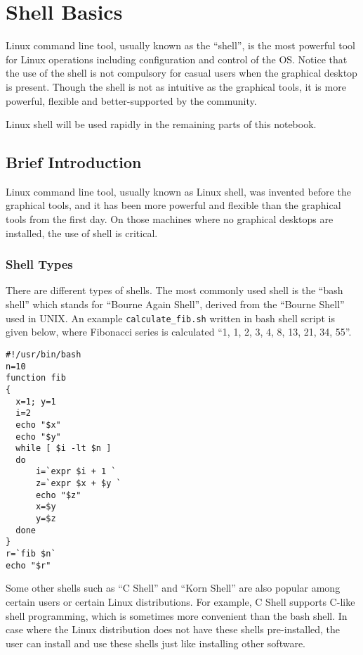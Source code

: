 \chapter{Shell Basics} \label{ch:sb}

Linux command line tool, usually known as the ``shell'', is the most powerful tool for Linux operations including configuration and control of the OS. Notice that the use of the shell is not compulsory for casual users when the graphical desktop is present. Though the shell is not as intuitive as the graphical tools, it is more powerful, flexible and better-supported by the community.

Linux shell will be used rapidly in the remaining parts of this notebook.

\section{Brief Introduction}

Linux command line tool, usually known as Linux shell, was invented before the graphical tools, and it has been more powerful and flexible than the graphical tools from the first day. On those machines where no graphical desktops are installed, the use of shell is critical.

\subsection{Shell Types}

There are different types of shells. The most commonly used shell is the ``bash shell'' which stands for ``Bourne Again Shell'', derived from the ``Bourne Shell'' used in UNIX. An example \verb|calculate_fib.sh| written in bash shell script is given below, where Fibonacci series is calculated ``1, 1, 2, 3, 4, 8, 13, 21, 34, 55''.

\begin{lstlisting}
#!/usr/bin/bash
n=10
function fib
{
  x=1; y=1
  i=2
  echo "$x"
  echo "$y"
  while [ $i -lt $n ]
  do
      i=`expr $i + 1 `
      z=`expr $x + $y `
      echo "$z"
      x=$y
      y=$z
  done
}
r=`fib $n`
echo "$r"
\end{lstlisting}

Some other shells such as ``C Shell'' and ``Korn Shell'' are also popular among certain users or certain Linux distributions. For example, C Shell supports C-like shell programming, which is sometimes more convenient than the bash shell. In case where the Linux distribution does not have these shells pre-installed, the user can install and use these shells just like installing other software.

